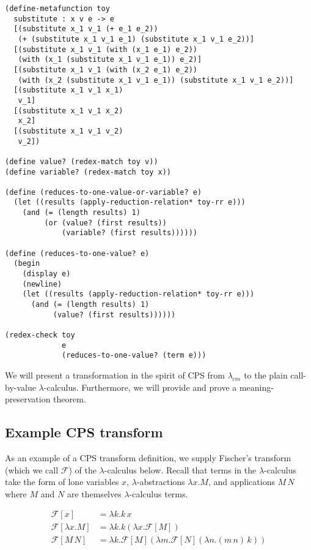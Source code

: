 \documentclass[ms,electronic,twosidetoc,letterpaper,chaptercenter,parttop]{byumsphd}
\begin{document}
\begin{verbatim}
(define-metafunction toy
  substitute : x v e -> e
  [(substitute x_1 v_1 (+ e_1 e_2))
   (+ (substitute x_1 v_1 e_1) (substitute x_1 v_1 e_2))]
  [(substitute x_1 v_1 (with (x_1 e_1) e_2))
   (with (x_1 (substitute x_1 v_1 e_1)) e_2)]
  [(substitute x_1 v_1 (with (x_2 e_1) e_2))
   (with (x_2 (substitute x_1 v_1 e_1)) (substitute x_1 v_1 e_2))]
  [(substitute x_1 v_1 x_1)
   v_1]
  [(substitute x_1 v_1 x_2)
   x_2]
  [(substitute x_1 v_1 v_2)
   v_2])

(define value? (redex-match toy v))
(define variable? (redex-match toy x))

(define (reduces-to-one-value-or-variable? e)
  (let ((results (apply-reduction-relation* toy-rr e)))
    (and (= (length results) 1)
         (or (value? (first results))
             (variable? (first results))))))

(define (reduces-to-one-value? e)
  (begin
    (display e)
    (newline)
    (let ((results (apply-reduction-relation* toy-rr e)))
      (and (= (length results) 1)
           (value? (first results))))))

(redex-check toy
             e
             (reduces-to-one-value? (term e)))
\end{verbatim}












We will present a transformation in the spirit of CPS from $\lambda_{cm}$ to 
the plain call-by-value $\lambda$-calculus. Furthermore, we will provide and 
prove a meaning-preservation theorem.

\subsection{Example CPS transform}

As an example of a CPS transform definition, we supply Fischer's transform 
(which we call $\mathcal{F}$) of the $\lambda$-calculus 
\cite{fischer1972lambda} below. Recall that terms in 
the $\lambda$-calculus take the form of lone variables $x$, 
$\lambda$-abstractions $\lambda x.M$, and applications 
$M\,N$ where $M$ and $N$ are themselves $\lambda$-calculus terms.

\begin{align*}
\mathcal{F}[x]           &= \lambda k.k\,x\\
\mathcal{F}[\lambda x.M] &= \lambda k.k(\lambda x.\mathcal{F}[M])\\
\mathcal{F}[M\,N]       &= \lambda k.\mathcal{F}[M](\lambda m.\mathcal{F}[N](\lambda n.(m\,n)\,k))
\end{align*}
\end{document}
